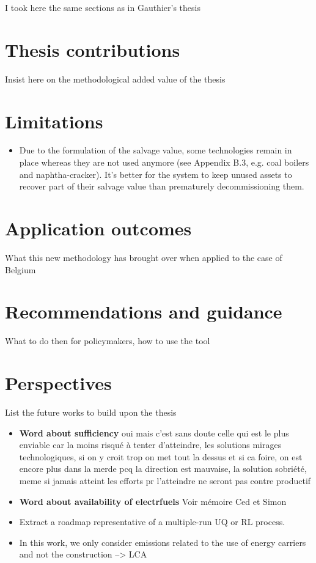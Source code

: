I took here the same sections as in Gauthier's thesis
\section*{Thesis contributions}
Insist here on the methodological added value of the thesis

\section*{Limitations}
\begin{itemize}
\item Due to the formulation of the salvage value, some technologies remain in place whereas they are not used anymore (see Appendix B.3, e.g. coal boilers and naphtha-cracker). It's better for the system to keep unused assets to recover part of their salvage value than prematurely decommissioning them.
\end{itemize}

\section*{Application outcomes}
What this new methodology has brought over when applied to the case of Belgium

\section*{Recommendations and guidance}
What to do then for policymakers, how to use the tool

\section*{Perspectives}
List the future works to build upon the thesis

\begin{itemize}
\item \textbf{Word about sufficiency} oui mais c'est sans doute celle qui est le plus enviable car la moins risqué à tenter d'atteindre, les solutions mirages technologiques, si on y croit trop on met tout la dessus et si ca foire, on est encore plus dans la merde pcq la direction est mauvaise, la solution sobriété, meme si jamais atteint les efforts pr l'atteindre ne seront pas contre productif
\item \textbf{Word about availability of electrfuels} Voir mémoire Ced et Simon
\item Extract a roadmap representative of a multiple-run UQ or RL process.
\item In this work, we only consider emissions related to the use of energy carriers and not the construction --> LCA
\end{itemize}


